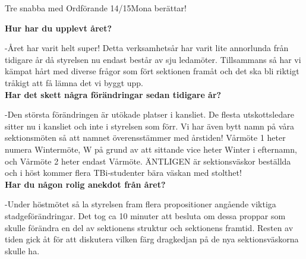 \begin{news}{2}{Tre snabba med Ordförande 14/15}{Mona berättar!}{}{}


  \noindent \textbf{Hur har du upplevt året?}  
  
  -Året har varit helt super! Detta
  verksamhetsår har varit lite annorlunda från tidigare år då
  styrelsen nu endast består av sju ledamöter. Tillsammans så har vi
  kämpat hårt med diverse frågor som fört sektionen framåt och det ska
  bli riktigt tråkigt att få lämna det vi byggt upp.
  \\

  \noindent \textbf{Har det skett några förändringar sedan tidigare år?}  
  
  -Den
  största förändringen är utökade platser i kansliet. De flesta
  utskottsledare sitter nu i kansliet och inte i styrelsen som
  förr. Vi har även bytt namn på våra sektionsmöten så att namnet
  överensstämmer med årstiden!  Vårmöte 1 heter numera Wintermöte, W
  på grund av att sittande vice heter Winter i efternamn, och Vårmöte
  2 heter endast Vårmöte. ÄNTLIGEN är sektionsväskor beställda och i
  höst kommer flera TBi-studenter bära väskan med stolthet!
  \\

  \noindent \textbf{Har du någon rolig anekdot från året?}  
  
  -Under höstmötet så
  la styrelsen fram flera propositioner angående viktiga
  stadgeförändringar. Det tog ca 10 minuter att besluta om dessa
  proppar som skulle förändra en del av sektionens struktur och
  sektionens framtid. Resten av tiden gick åt för att diskutera vilken
  färg dragkedjan på de nya sektionsväskorna skulle ha.




\end{news}
